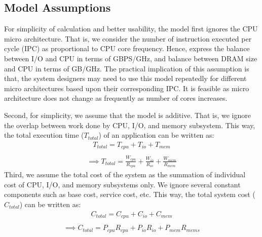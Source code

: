 \documentclass[journal]{IEEEtran}
\begin{document}
\subsection{Model Assumptions}
For simplicity of calculation and better usability, the model first ignores the CPU micro architecture. That is, we  consider the number of instruction executed per cycle (IPC) as proportional to CPU core frequency. Hence, express the balance between I/O and CPU in terms of GBPS/GHz, and balance between DRAM size and CPU in terms of GB/GHz. The practical implication of this assumption is that, the system designers may need to use this model repeatedly for different micro architectures based upon their corresponding IPC. It is feasible as micro architecture does not change as frequently as number of cores increases.
  
Second, for simplicity, we assume that the model is additive. That is, we ignore the overlap between work done by CPU, I/O, and memory subsystem. This way, the total execution time ($T_{total}$) of an application can be written as:
\begin{equation} %
\begin{split}
T_{total} = T_{cpu} + T_{io} + T_{mem} \\
\end{split}
\end{equation}
\begin{equation} \label{eqn:TotalTime}
\begin{split}
\implies T_{total}  = \frac{W_{cpu}}{R_{cpu}} + \frac{W_{io}}{R_{io}} + \frac{W_{mem}}{R_{mem}}
\end{split}
\end{equation}
Third, we assume the total cost of the system as the summation of individual cost of CPU, I/O, and memory subsystems only. We ignore several constant components such as base cost, service cost, etc. This way, the total system cost ($C_{total}$) can be written as:
\begin{equation} %
\begin{split}
C_{total} = C_{cpu} + C_{io} + C_{mem} \\
\end{split}
\end{equation}
\begin{equation} \label{eqn:TotalCost}
\begin{split}
\implies C_{total} = P_{cpu}R_{cpu} + P_{io}R_{io} + P_{mem}R_{mems}
\end{split}
\end{equation}
\end{document}
